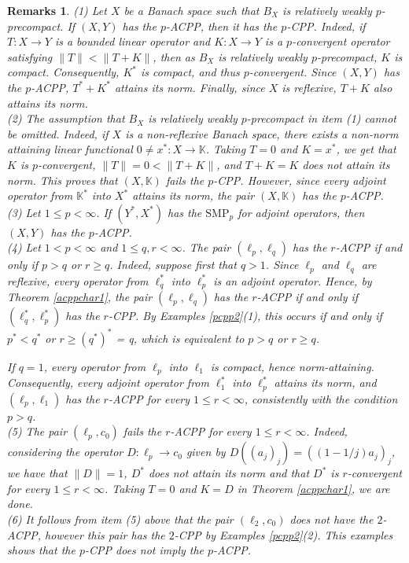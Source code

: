 \documentclass[12 pt]{article}%
\newtheorem{remarks}[theorem]{Remarks}
\newtheorem{final remark}[theorem]{Final Remark}
\newcommand {\K} {\mathbb{K}}
\newcommand{\norma}[1]{\| #1 \|}
\begin{document}
\begin{remarks} \rm 
(1) Let $X$ be a Banach space such that $B_X$ is relatively weakly $p$-precompact. If $(X, Y)$ has the $p$-ACPP, then it has the $p$-CPP. Indeed, if $T: X \to Y$ is a bounded linear operator and $K: X \to Y$ is a $p$-convergent operator satisfying $\norma{T} <\norma{T+K}$, then as $B_X$ is relatively weakly $p$-precompact, $K$ is compact. 
Consequently, $K^{*}$ is compact, and thus $p$-convergent. Since $(X,Y)$ has the $p$-ACPP, $T^* + K^*$ attains its norm. Finally, since $X$ is reflexive, $T+K$ also attains its norm.  \\
(2) The assumption that $B_X$ is relatively weakly $p$-precompact in item (1) cannot be omitted. Indeed, if $X$ is a non-reflexive Banach space, there exists a non-norm attaining linear functional $0 \neq x^*: X \to \K$. 
Taking $T = 0$ and $K= x^*$, we get that $K$ is $p$-convergent,
$\norma{T} = 0 < \norma{T+K}$, and $T+K = K$ does not attain its norm. This proves that $(X, \K)$ fails the $p$-CPP. However, since every adjoint operator from $\K^*$ into $X^*$ attains its norm, the pair $(X, \K)$ has the $p$-ACPP. \\
(3) Let $1\leq p<\infty$. If $(Y^*,X^*)$ has the $\mathrm{SMP}_p$
for adjoint operators, then $(X,Y)$ has the $p$-ACPP.  \\ 
{\rm (4)} Let $1 <p < \infty$ and $1 \leq q,r< \infty$. The pair $(\ell_p,\ell_q)$ has the $r$-ACPP if and only if $p > q$ or $r \geq q$. Indeed, suppose first that $q > 1$. Since $\ell_p$ and $\ell_q$ are reflexive, every operator from $\ell_q^*$ into $\ell_p^*$ is an adjoint operator. Hence, by Theorem \ref{acppchar1}, the pair $(\ell_p, \ell_q)$ has the $r$-ACPP if and only if $(\ell_q^*, \ell_p^*)$ has the $r$-CPP. By Examples 
\ref{pcpp2}(1), this occurs if and only if $p^* < q^*$ or $r \geq (q^*)^*$ = q, which is equivalent to $p > q$ or $r \geq q$.

If $q=1$, every operator from $\ell_p$ into $\ell_1$ is compact, hence norm-attaining. Consequently, every adjoint operator from $\ell_1^*$ into $\ell_p^*$ attains its norm, and $(\ell_p, \ell_1)$ has the $r$-ACPP for every $1 \leq r < \infty$, consistently with the condition $p > q$. \\
(5) The pair $(\ell_p, c_0)$ fails the $r$-ACPP for every $1 \leq r < \infty$. Indeed, considering the operator $D: \ell_p \to c_0$ given by $D((a_j)_j) = ((1-1/j)a_j)_j$, we have that $\norma{D} = 1$, $D^*$ does not attain its norm and that $D^*$ is $r$-convergent for every $1 \leq r < \infty$. Taking $T = 0$ and $K = D$ in Theorem \ref{acppchar1}, we are done. \\
(6) It follows from item (5) above that the pair $(\ell_2, c_0)$ does not have the $2$-ACPP, however this pair has the $2$-CPP by Examples \ref{pcpp2}(2). This examples shows that the $p$-CPP does not imply the $p$-ACPP. 
\end{remarks}
\end{document}
